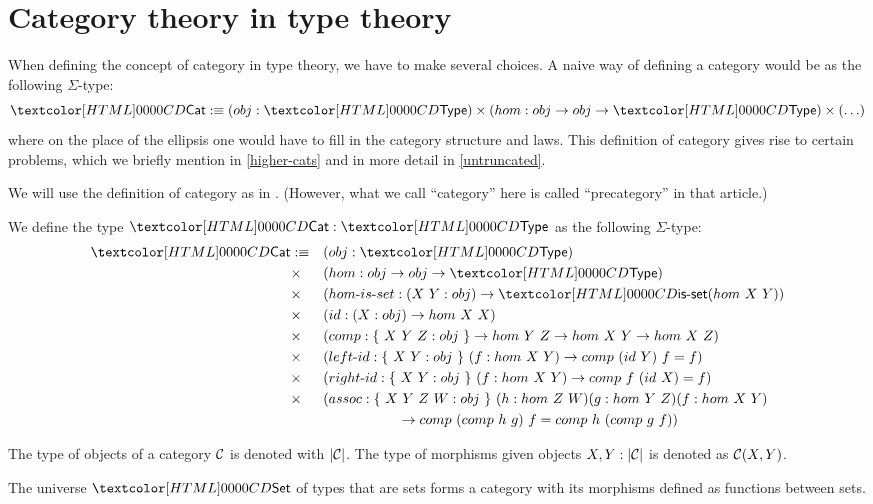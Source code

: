 \section{Category theory in type theory}

When defining the concept of category in type theory, we have to make
several choices. A naive way of defining a category would be as the
following $\Sigma$-type:
$$
\Cat \ddefeq (obj : \Type) \times (hom : obj \to obj \to \Type) \times (\hdots)
$$
where on the place of the ellipsis one would have to fill in the
category structure and laws. This definition of category gives rise to
certain problems, which we briefly mention in \cref{higher-cats} and
in more detail in \cref{untruncated}.

We will use the definition of category as in
\cite{Ahrens2015}. (However, what we call ``category'' here is called
``precategory'' in that article.)

\begin{definition}[Category]
  We define the type $\Cat : \Type$ as the following $\Sigma$-type:
  \begin{align*}
    \Cat &\ddefeq &&(obj : \Type) \\
         &\times &&(hom : obj \to obj \to \Type) \\
         &\times &&(\identalt{hom-is-set} : (X\ Y : obj) \to \isset (hom\ X\ Y)) \\
         &\times &&(id : (X : obj) \to hom\ X\ X) \\
         &\times &&(comp : \{\ X\ Y\ Z : obj\ \} \to hom\ Y\ Z \to hom\ X\ Y \to hom\ X\ Z) \\
         &\times &&(\identalt{left-id} : \{\ X\ Y : obj\ \}\ (f : hom\ X\ Y) \to comp\ (id\ Y)\ f = f) \\
         &\times &&(\identalt{right-id} : \{\ X\ Y : obj\ \}\ (f : hom\ X\ Y) \to comp\ f\ (id\ X) = f) \\
         &\times &&(assoc : \{\ X\ Y\ Z\ W : obj\ \}\ (h : hom\ Z\ W) (g : hom\ Y\ Z) (f : hom\ X\ Y) \\
         & &&\ \ \ \ \ \ \ \ \ \ \ \ \ \ \ \ \to comp\ (comp\ h\ g)\ f = comp\ h\ (comp\ g\ f))
  \end{align*}
\end{definition}

The type of objects of a category $\mathcal{C}$ is denoted with $| \mathcal{C} |$. The
type of morphisms given objects $X, Y : | \mathcal{C} |$ is denoted as
$\mathcal{C}(X,Y)$.

\begin{example}
  The universe $\Set$ of types that are sets forms a category with its
  morphisms defined as functions between sets.
\end{example}


